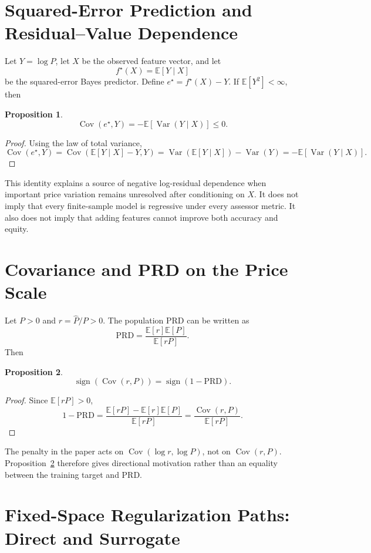 \documentclass[10pt]{article}
\newtheorem{proposition}{Proposition}
\theoremstyle{definition}
\newcommand{\E}{\mathbb{E}}
\newcommand{\Cov}{\operatorname{Cov}}
\newcommand{\Var}{\operatorname{Var}}
\newcommand{\1}{\mathbf{1}}
\begin{document}
\section{Squared-Error Prediction and Residual--Value Dependence}
\label{app:population_identity}

Let $Y=\log P$, let $X$ be the observed feature vector, and let
\[
f^\star(X)=\E[Y\mid X]
\]
be the squared-error Bayes predictor. Define $e^\star=f^\star(X)-Y$. If $\E[Y^2]<\infty$, then
\begin{proposition}
\label{prop:bayes_covariance}
\[
\Cov(e^\star,Y)
=
-\E[\Var(Y\mid X)]
\le 0.
\]
\end{proposition}
\begin{proof}
Using the law of total variance,
\[
\Cov(e^\star,Y)
=
\Cov(\E[Y\mid X]-Y,Y)
=
\Var(\E[Y\mid X])-\Var(Y)
=
-\E[\Var(Y\mid X)].
\]
\end{proof}

This identity explains a source of negative log-residual dependence when important price variation remains unresolved after conditioning on $X$. It does not imply that every finite-sample model is regressive under every assessor metric. It also does not imply that adding features cannot improve both accuracy and equity.

\section{Covariance and PRD on the Price Scale}
\label{app:cov_prd}

Let $P>0$ and $r=\widehat P/P>0$. The population PRD can be written as
\[
\mathrm{PRD}
=
\frac{\E[r]\E[P]}{\E[rP]}.
\]
Then
\begin{proposition}
\label{prop:cov_prd}
\[
\operatorname{sign}\!\left(\Cov(r,P)\right)
=
\operatorname{sign}(1-\mathrm{PRD}).
\]
\end{proposition}
\begin{proof}
Since $\E[rP]>0$,
\[
1-\mathrm{PRD}
=
\frac{\E[rP]-\E[r]\E[P]}{\E[rP]}
=
\frac{\Cov(r,P)}{\E[rP]}.
\]
\end{proof}

The penalty in the paper acts on $\Cov(\log r,\log P)$, not on $\Cov(r,P)$. Proposition~\ref{prop:cov_prd} therefore gives directional motivation rather than an equality between the training target and PRD.

\section{Fixed-Space Regularization Paths: Direct and Surrogate}
\label{app:theory}
\end{document}
